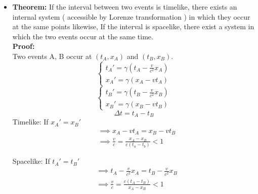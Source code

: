 \documentclass[fleqn,a4paper,12pt]{article}
\begin{document}
\begin{itemize}
\begin{itemize}
        \item 
          \textbf{Theorem:} If the interval between two events is timelike, there exists an internal system ( accessible by Lorenze transformation ) in which they occur at the same points likewise, If the interval is spacelike, there exist a system in which the two events occur at the same time.\\
          \textbf{Proof:} \\
          Two events A, B occur at $(t_A,x_A)$ and $(t_B,x_B)$.
          \[ 
            \begin{cases}
              t_A' = \gamma( t_A-\frac{v}{c^2}x_A )\\
              x_A' = \gamma( x_A - vt_A )
            \end{cases}
          \]
          \[ 
            \begin{cases}
              t_B' = \gamma( t_B-\frac{v}{c^2}x_B )\\
              x_B' = \gamma( x_B - vt_B )
            \end{cases}
          \]
          \[
            \Delta t = t_A -t_B
          \]
          Timelike: If $x_A' = x_B'$
          \begin{align*}            
            &\implies x_A - vt_A = x_B - vt_B \\
            &\implies \frac{v}{c} = \frac { x_A - x_B }{ c( t_a - t_b ) }  < 1 
          \end{align*}

          Spacelike: If $t_A' = t_B'$
          \begin{align*}            
            &\implies t_A - \frac{v}{c^2}x_A = t_B - \frac{v}{c^2}x_B \\
            &\implies \frac{v}{c} = \frac {c( t_A - t_B )}{ x_A - x_B } < 1 \\                          
          \end{align*}
          

            


    \end{itemize}

\end{itemize}
\end{document}
